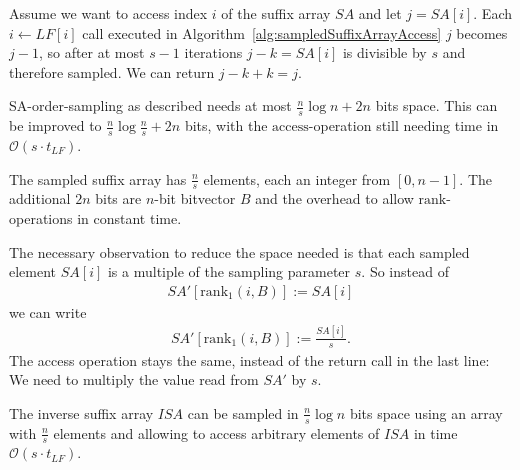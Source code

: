 \begin{Proof}
  Assume we want to access index $i$ of the suffix array $SA$ and let $j = SA[i]$. Each $i \leftarrow LF[i]$ call executed in Algorithm~\ref{alg:sampledSuffixArrayAccess} $j$ becomes $j-1$, so after at most $s - 1$ iterations $j - k = SA[i]$ is divisible by $s$ and therefore sampled. We can return $j - k + k = j$.
\end{Proof}

\begin{Theorem}
  SA-order-sampling as described needs at most $\frac{n}{s}\log n + 2n$ bits space. This can be improved to $\frac{n}{s}\log\frac{n}{s} + 2n$ bits, with the $\mathrm{access}$-operation still needing time in $\mathcal{O}(s\cdot t_{LF})$.
\end{Theorem}

\begin{Proof}
  The sampled suffix array has $\frac{n}{s}$ elements, each an integer from $[0,n-1]$. The additional $2n$ bits are $n$-bit bitvector $B$ and the overhead to allow $\mathrm{rank}$-operations in constant time.

  The necessary observation to reduce the space needed is that each sampled element $SA[i]$ is a multiple of the sampling parameter $s$. So instead of \begin{align}
    SA'[\mathrm{rank}_1(i, B)] := SA[i]
  \end{align}
  we can write
  \begin{align}
    SA'[\mathrm{rank}_1(i, B)] := \frac{SA[i]}{s}
    \text{.}
  \end{align}
  The access operation stays the same, instead of the return call in the last line: We need to multiply the value read from $SA'$ by $s$.
\end{Proof}

\begin{Theorem}
  The inverse suffix array $ISA$ can be sampled in $\frac{n}{s}\log n$ bits space using an array with $\frac{n}{s}$ elements and allowing to access arbitrary elements of $ISA$ in time $\mathcal{O}(s\cdot t_{LF})$.
\end{Theorem}

